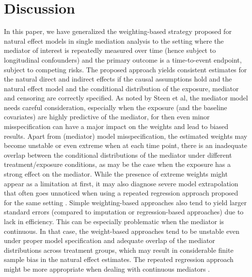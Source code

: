 \documentclass[AMA,STIX1COL]{WileyNJD-v2}
\begin{document}
\section{Discussion}
In this paper, we have generalized the weighting-based strategy proposed for natural effect models in single mediation analysis to the setting where the mediator of interest is repeatedly measured over time (hence subject to longitudinal confounders) and the primary outcome is a time-to-event endpoint, subject to competing risks. The proposed approach yields consistent estimates for the natural direct and indirect effects if the causal assumptions hold and the natural effect model and the conditional distribution of the exposure, mediator and censoring are correctly specified. As noted by Steen et al\citep{steen17.2}, the mediator model needs careful consideration, especially when the exposure (and the baseline covariates) are highly predictive of the mediator, for then even minor misspecification can have a major impact on the weights and lead to biased results. Apart from (mediator) model misspecification, the estimated weights may become unstable or even extreme when at each time point, there is an inadequate overlap between the conditional distributions of the mediator under different treatment/exposure conditions, as may be the case when the exposure has a strong effect on the mediator. While the presence of extreme weights might appear as a limitation at first, it may also diagnose severe model extrapolation that often goes unnoticed when using a repeated regression approach proposed for the same setting \citep{steen17.2}. Simple weighting-based approaches also tend to yield larger standard errors (compared to imputation or regression-based approaches) due to lack in efficiency. This can be especially problematic when the mediator is continuous. In that case, the weight-based approaches tend to be unstable even under proper model specification and adequate overlap of the mediator distributions across treatment groups, which may result in considerable finite sample bias in the natural effect estimates. The repeated regression approach might be more appropriate when dealing with continuous mediators \citep{steen17, vansteelandt2012imputation}.
\end{document}
